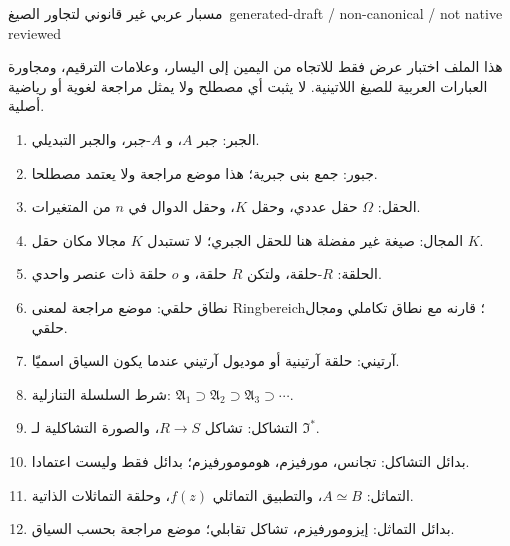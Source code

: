 \documentclass[12pt]{article}
\begin{document}
\begin{center}
{\Large مسبار عربي غير قانوني لتجاور الصيغ}\
{\small generated-draft / non-canonical / not native reviewed}
\end{center}

هذا الملف اختبار عرض فقط للاتجاه من اليمين إلى اليسار، وعلامات الترقيم، ومجاورة العبارات العربية للصيغ اللاتينية. لا يثبت أي مصطلح ولا يمثل مراجعة لغوية أو رياضية أصلية.

\begin{enumerate}
\item الجبر: جبر \(A\)، و \(A\)-جبر، والجبر التبديلي.
\item جبور: جمع بنى جبرية؛ هذا موضع مراجعة ولا يعتمد مصطلحا.
\item الحقل: \(\Omega\) حقل عددي، وحقل \(K\)، وحقل الدوال في \(n\) من المتغيرات.
\item المجال: صيغة غير مفضلة هنا للحقل الجبري؛ لا تستبدل \(K\) مجالا مكان حقل \(K\).
\item الحلقة: \(R\)-حلقة، ولتكن \(R\) حلقة، و \(o\) حلقة ذات عنصر واحدي.
\item نطاق حلقي: موضع مراجعة لمعنى \textenglish{Ringbereich}؛ قارنه مع نطاق تكاملي ومجال حلقي.
\item آرتيني: حلقة آرتينية أو موديول آرتيني عندما يكون السياق اسميّا.
\item شرط السلسلة التنازلية: \(\mathfrak A_1\supset\mathfrak A_2\supset\mathfrak A_3\supset\cdots\).
\item التشاكل: تشاكل \(R\to S\)، والصورة التشاكلية لـ \(\Im^*\).
\item بدائل التشاكل: تجانس، مورفيزم، هومومورفيزم؛ بدائل فقط وليست اعتمادا.
\item التماثل: \(A\simeq B\)، والتطبيق التماثلي \(f(z)\)، وحلقة التماثلات الذاتية.
\item بدائل التماثل: إيزومورفيزم، تشاكل تقابلي؛ موضع مراجعة بحسب السياق.
\end{enumerate}
\end{document}
